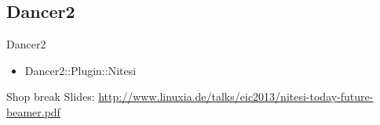\subsection{Dancer2}
\begin{frame}{Dancer2}
\begin{itemize}
\item Dancer2::Plugin::Nitesi
\end{itemize}
\end{frame}

\begin{frame}{Shop break}
Slides:
\url{http://www.linuxia.de/talks/eic2013/nitesi-today-future-beamer.pdf}
\end{frame}




